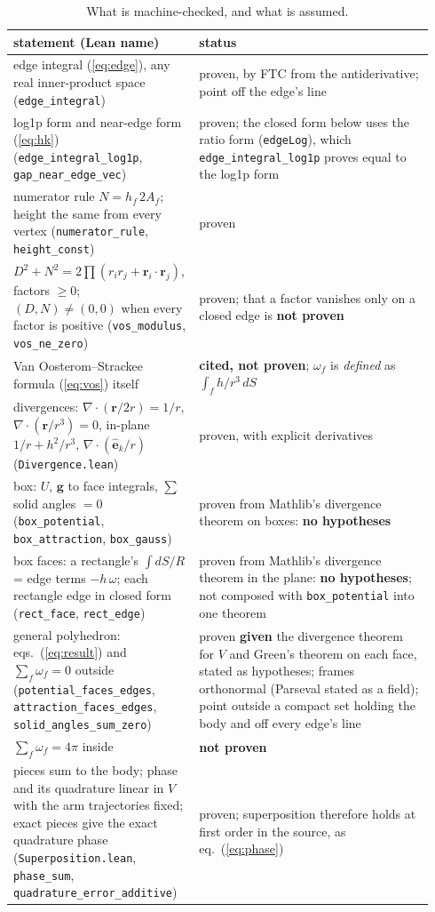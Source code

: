 \documentclass[10pt,a4paper]{article}
\newcommand{\vr}{\mathbf{r}}
\begin{document}
\begin{table}[tbp]\centering\small
\caption{What is machine-checked, and what is assumed.}\label{tab:lean}
\begin{tabular}{>{\raggedright}p{0.4\linewidth}>{\raggedright\arraybackslash}p{0.54\linewidth}}\toprule
statement (Lean name) & status\\\midrule
edge integral (\ref{eq:edge}), any real inner-product space (\texttt{edge\_integral}) & proven, by FTC
from the antiderivative; point off the edge's line\\
log1p form and near-edge form (\ref{eq:hk}) (\texttt{edge\_integral\_log1p}, \texttt{gap\_near\_edge\_vec}) & proven; the closed form below uses the ratio form (\texttt{edgeLog}), which \texttt{edge\_integral\_log1p} proves equal to the log1p form\\
numerator rule $N = h_f\,2A_f$; height the same from every vertex (\texttt{numerator\_rule}, \texttt{height\_const}) & proven\\
$D^2+N^2 = 2\prod(r_ir_j+\vr_i\cdot\vr_j)$, factors $\ge0$; $(D,N)\neq(0,0)$ when every factor is positive (\texttt{vos\_modulus}, \texttt{vos\_ne\_zero}) & proven; that a factor vanishes only on a closed edge is \textbf{not proven}\\
Van Oosterom--Strackee formula (\ref{eq:vos}) itself & \textbf{cited, not proven}; $\omega_f$ is
\emph{defined} as $\int_f h/r^3\,dS$\\
divergences: $\nabla\cdot(\vr/2r)=1/r$, $\nabla\cdot(\vr/r^3)=0$, in-plane $1/r+h^2/r^3$, $\nabla\cdot(\hat{\mathbf{e}}_k/r)$ (\texttt{Divergence.lean}) & proven, with explicit derivatives\\
box: $U$, $\mathbf{g}$ to face integrals, $\sum$ solid angles $=0$ (\texttt{box\_potential}, \texttt{box\_attraction}, \texttt{box\_gauss}) & proven from Mathlib's divergence theorem on boxes: \textbf{no hypotheses}\\
box faces: a rectangle's $\int dS/R$ = edge terms $- h\,\omega$; each rectangle edge in closed form
(\texttt{rect\_face}, \texttt{rect\_edge}) & proven from Mathlib's divergence theorem in the plane:
\textbf{no hypotheses}; not composed with \texttt{box\_potential} into one theorem\\
general polyhedron: eqs.~(\ref{eq:result}) and $\sum_f\omega_f=0$ outside (\texttt{potential\_faces\_edges}, \texttt{attraction\_faces\_edges}, \texttt{solid\_angles\_sum\_zero}) & proven \textbf{given} the divergence theorem for $V$ and Green's theorem on each face, stated as hypotheses; frames orthonormal (Parseval stated as a field); point outside a compact set holding the body and off every edge's line\\
$\sum_f\omega_f = 4\pi$ inside & \textbf{not proven}\\
pieces sum to the body; phase and its quadrature linear in $V$ with the arm trajectories fixed; exact
pieces give the exact quadrature phase (\texttt{Superposition.lean}, \texttt{phase\_sum},
\texttt{quadrature\_error\_additive}) & proven; superposition therefore holds at first order in the
source, as eq.~(\ref{eq:phase})\\\bottomrule
\end{tabular}
\end{table}
\end{document}
